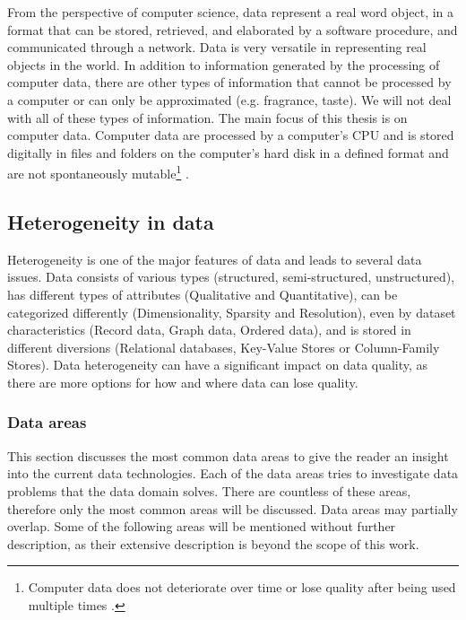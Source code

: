			From the perspective of computer science, data represent a real word object, in a format that can be stored, retrieved, and elaborated by a software procedure, and communicated through a network. Data is very versatile in representing real objects in the world. In addition to information generated by the processing of computer data, there are other types of information that cannot be processed by a computer or can only be approximated (e.g. fragrance, taste). We will not deal with all of these types of information. The main focus of this thesis is on computer data. Computer data are processed by a computer's CPU and is stored digitally in files and folders on the computer's hard disk in a defined format and are not spontaneously mutable\footnote{Computer data does not deteriorate over time or lose quality after being used multiple times \cite{Christensson2006}.} \cite{Christensson2006}.
		   
		\subsection{Heterogeneity in data}
		\label{subsec:heterogeneity_in_data} 
			
			Heterogeneity is one of the major features of data and leads to several data issues. Data consists of various types (structured, semi-structured, unstructured), has different types of attributes (Qualitative and Quantitative), can be categorized differently (Dimensionality, Sparsity and Resolution), even by dataset characteristics (Record data, Graph data, Ordered data), and is stored in different diversions (Relational databases, Key-Value Stores or Column-Family Stores). Data heterogeneity can have a significant impact on data quality, as there are more options for how and where data can lose quality.
														
			\subsubsection{Data areas}
			\label{sub:data_areas}			
						
				This section discusses the most common data areas to give the reader an insight into the current data technologies. Each of the data areas tries to investigate data problems that the data domain solves. There are countless of these areas, therefore only the most common areas will be discussed. Data areas may partially overlap. Some of the following areas will be mentioned without further description, as their extensive description is beyond the scope of this work. 
				
